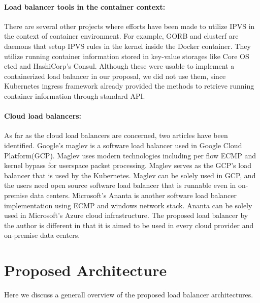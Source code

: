 \paragraph{\bf Load balancer tools in the container context:}
There are several other projects where efforts have been made to utilize IPVS in the context of container environment.
For example, GORB\cite{Sibiryov2015} and clusterf\cite{Aaltodoc:http://urn.fi/URN:NBN:fi:aalto-201611025433} are daemons 
that setup IPVS rules in the kernel inside the Docker container. 
They utilize running container information stored in key-value storages
like Core OS etcd\cite{CoreOSEtcd} and HashiCorp's Consul\cite{HashiCorpConsul}. 
Although these were usable to implement a containerized load balancer in our proposal, we did not use them, 
since Kubernetes ingress framework already provided the methods to retrieve running container information through standard API.

\paragraph{\bf Cloud load balancers:}

As far as the cloud load balancers are concerned, two articles have been identified.
Google's maglev\cite{eisenbud2016maglev} is a software load balancer used in Google Cloud Platform(GCP)\cite{Voellm2013}.
Maglev uses modern technologies including per flow ECMP and kernel bypass for userspace packet processing.
Maglev serves as the GCP's load balancer that is used by the Kubernetes.
Maglev can be solely used in GCP, and the users need open source software load balancer that is runnable even in on-premise data centers.
Microsoft's Ananta\cite{patel2013ananta} is another software load balancer implementation using ECMP and windows network stack.
Ananta can be solely used in Microsoft's Azure cloud infrastructure\cite{patel2013ananta}.
The proposed load balancer by the author is different in that it is aimed to be used in every cloud provider and on-premise data centers.

\section{Proposed Architecture}\label{Proposed Architecture}

Here we discuss a generall overview of the proposed load balancer architectures.


